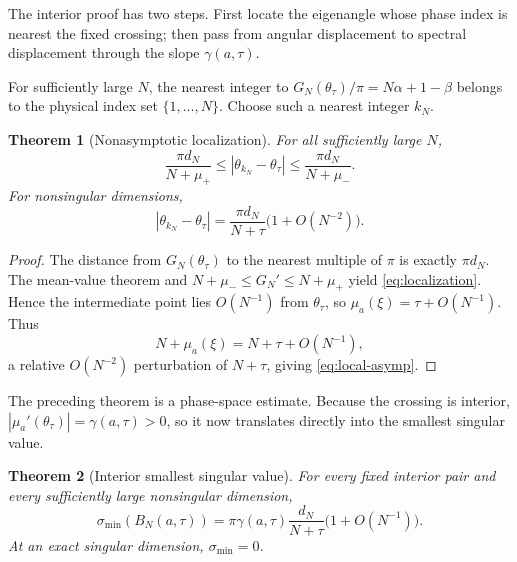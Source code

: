 \documentclass[11pt,reqno]{amsart}
\theoremstyle{plain}
\newtheorem{theorem}{Theorem}
\theoremstyle{definition}
\newcommand{\BN}{B_N}
\begin{document}
The interior proof has two steps.  First locate the eigenangle whose phase index is
nearest the fixed crossing; then pass from angular displacement to spectral
displacement through the slope $\gamma(a,\tau)$.

For sufficiently large $N$, the nearest integer to
$G_N(\theta_\tau)/\pi=N\alpha+1-\beta$ belongs to the physical index set
$\{1,\ldots,N\}$.  Choose such a nearest integer $k_N$.

\begin{theorem}[Nonasymptotic localization]\label{thm:localization}
For all sufficiently large $N$,
\begin{equation}\label{eq:localization}
\frac{\pi d_N}{N+\mu_+}
\le
|\theta_{k_N}-\theta_\tau|
\le
\frac{\pi d_N}{N+\mu_-}.
\end{equation}
For nonsingular dimensions,
\begin{equation}\label{eq:local-asymp}
\boxed{
|\theta_{k_N}-\theta_\tau|
=\frac{\pi d_N}{N+\tau}\bigl(1+O(N^{-2})\bigr).}
\end{equation}
\end{theorem}

\begin{proof}
The distance from $G_N(\theta_\tau)$ to the nearest multiple of $\pi$ is exactly
$\pi d_N$.  The mean-value theorem and
$N+\mu_-\le G_N'\le N+\mu_+$ yield \eqref{eq:localization}.  Hence the intermediate
point lies $O(N^{-1})$ from $\theta_\tau$, so
$\mu_a(\xi)=\tau+O(N^{-1})$.  Thus
\[
N+\mu_a(\xi)=N+\tau+O(N^{-1}),
\]
a relative $O(N^{-2})$ perturbation of $N+\tau$, giving
\eqref{eq:local-asymp}.
\end{proof}

The preceding theorem is a phase-space estimate.  Because the crossing is interior,
$|\mu_a'(\theta_\tau)|=\gamma(a,\tau)>0$, so it now translates directly into the
smallest singular value.

\begin{theorem}[Interior smallest singular value]\label{thm:smin}
For every fixed interior pair and every sufficiently large nonsingular dimension,
\begin{equation}\label{eq:smin}
\boxed{
\sigma_{\min}(\BN(a,\tau))
=\pi\gamma(a,\tau)\frac{d_N}{N+\tau}
\bigl(1+O(N^{-1})\bigr).}
\end{equation}
At an exact singular dimension, $\sigma_{\min}=0$.
\end{theorem}
\end{document}
